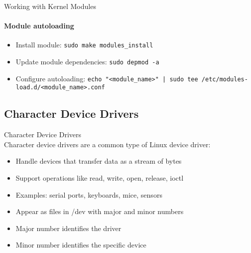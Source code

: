 \begin{KR}{Working with Kernel Modules}
    \paragraph{Module autoloading}
    \begin{itemize}
        \item Install module: \texttt{sudo make modules\_install}
        \item Update module dependencies: \texttt{sudo depmod -a}
        \item Configure autoloading: \texttt{echo "<module\_name>" | sudo tee /etc/modules-load.d/<module\_name>.conf}
    \end{itemize}
\end{KR}

\subsection{Character Device Drivers}

\begin{definition}{Character Device Drivers}\\
    Character device drivers are a common type of Linux device driver:
    \begin{itemize}
        \item Handle devices that transfer data as a stream of bytes
        \item Support operations like read, write, open, release, ioctl
        \item Examples: serial ports, keyboards, mice, sensors
        \item Appear as files in /dev with major and minor numbers
        \item Major number identifies the driver
        \item Minor number identifies the specific device
    \end{itemize}
\end{definition}

